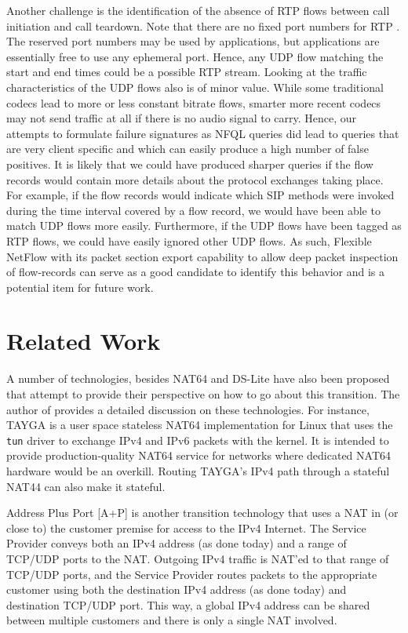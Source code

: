 \documentclass{llncs}
\begin{document}
Another challenge is the identification of the absence of RTP flows between call initiation and call teardown. Note that there are no fixed port numbers for RTP \cite{rfc3551}. The reserved port numbers may be used by applications, but applications are essentially free to use any ephemeral port. Hence, any UDP flow matching the start and end times could be a possible RTP stream. Looking at the traffic characteristics of the UDP flows also is of minor value. While some traditional codecs lead to more or less constant bitrate flows, smarter more recent codecs may not send traffic at all if there is no audio signal to carry. Hence, our attempts to formulate failure signatures as NFQL queries did lead to queries that are very client specific and which can easily produce a high number of false positives. It is likely that we could have produced sharper queries if the flow records would contain more details about the protocol exchanges taking place. For example, if the flow records would indicate which SIP methods were invoked during the time interval covered by a flow record, we would have been able to match UDP flows more easily. Furthermore, if the UDP flows have been tagged as RTP flows, we could have easily ignored other UDP flows. As such, Flexible NetFlow \cite{flexiblenetflow:2008} with its packet section export capability to allow deep packet inspection of flow-records can serve as a good candidate to identify this behavior and is a potential item for future work.

\section{Related Work}
\label{sec:related-ipv6}

A number of technologies, besides NAT64 and DS-Lite have also been proposed that attempt to provide their perspective on how to go about this transition. The author of \cite{GEOFFAPNIC} provides a detailed discussion on these technologies. For instance, TAYGA \cite{TAYGA} is a user space stateless NAT64 implementation for Linux that uses the \texttt{tun} driver to exchange IPv4 and IPv6 packets with the kernel. It is intended to provide production-quality NAT64 service for networks where dedicated NAT64 hardware would be an overkill. Routing TAYGA's IPv4 path through a stateful NAT44 can also make it stateful. 

Address Plus Port [A+P] \cite{AP} is another transition technology that uses a NAT in (or close to) the customer premise for access to the IPv4 Internet. The Service Provider conveys both an IPv4 address (as done today) and a range of TCP/UDP ports to the NAT. Outgoing IPv4 traffic is NAT'ed to that range of TCP/UDP ports, and the Service Provider routes packets to the appropriate customer using both the destination IPv4 address (as done today) and destination TCP/UDP port. This way, a global IPv4 address can be shared between multiple customers and there is only a single NAT involved.
\end{document}
